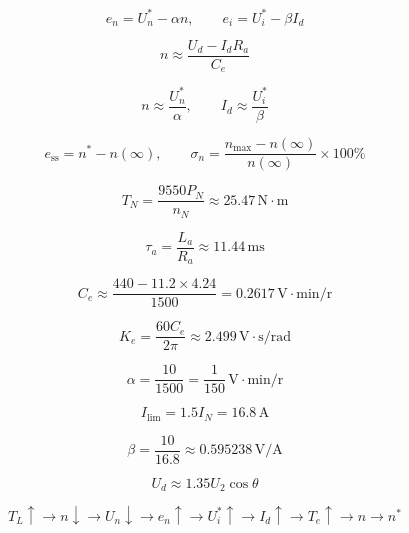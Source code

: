 
\begin{equation}
e_n=U_n^*-\alpha n,\qquad e_i=U_i^*-\beta I_d\tag{1-1}
\end{equation}

\begin{equation}
n\approx\frac{U_d-I_dR_a}{C_e}\tag{1-2}
\end{equation}

\begin{equation}
n\approx\frac{U_n^*}{\alpha},\qquad I_d\approx\frac{U_i^*}{\beta}\tag{1-3}
\end{equation}

\begin{equation}
e_{\mathrm{ss}}=n^*-n(\infty),\qquad\sigma_n=\frac{n_{\max}-n(\infty)}{n(\infty)}\times100\%\tag{1-4}
\end{equation}

\[
T_N=\frac{9550P_N}{n_N}\approx25.47\,\mathrm{N\cdot m}
\]

\[
\tau_a=\frac{L_a}{R_a}\approx11.44\,\mathrm{ms}
\]

\[
C_e\approx\frac{440-11.2\times4.24}{1500}=0.2617\,\mathrm{V\cdot min/r}
\]

\[
K_e=\frac{60C_e}{2\pi}\approx2.499\,\mathrm{V\cdot s/rad}
\]

\[
\alpha=\frac{10}{1500}=\frac1{150}\,\mathrm{V\cdot min/r}
\]

\[
I_{\mathrm{lim}}=1.5I_N=16.8\,\mathrm A
\]

\[
\beta=\frac{10}{16.8}\approx0.595238\,\mathrm{V/A}
\]

\[
U_d\approx1.35U_2\cos\theta
\]

\[
T_L\uparrow\to n\downarrow\to U_n\downarrow\to e_n\uparrow\to U_i^*\uparrow\to I_d\uparrow\to T_e\uparrow\to n\to n^*
\]
